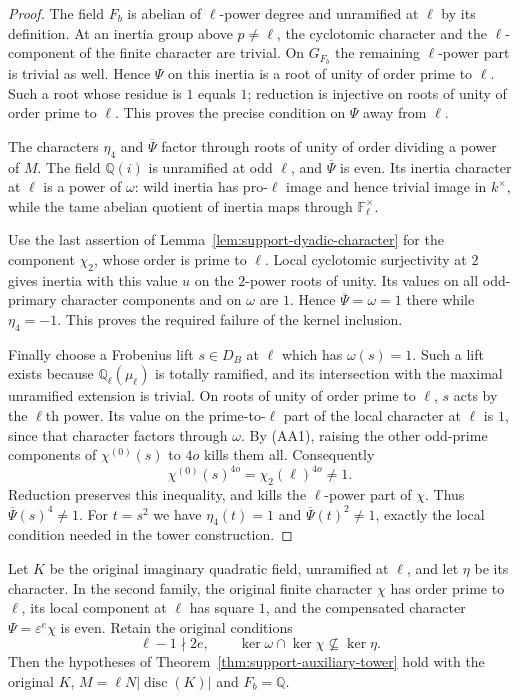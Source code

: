 \begin{proof}
The field $F_b$ is abelian of $\ell$-power degree and
unramified at $\ell$ by its definition.  At an inertia
group above $p\ne\ell$, the cyclotomic character and the
$\ell$-component of the finite character are trivial.
On $G_{F_b}$ the remaining $\ell$-power part is trivial
as well.  Hence $\Psi$ on this inertia is a root of unity
of order prime to $\ell$.  Such a root whose residue is
$1$ equals $1$; reduction is injective on roots of unity
of order prime to $\ell$.  This proves the precise
condition on $\Psi$ away from $\ell$.

The characters $\eta_4$ and $\overline\Psi$ factor through
roots of unity of order dividing a power of $M$.
The field $\mathbb Q(i)$ is unramified at odd $\ell$,
and $\overline\Psi$ is even.  Its inertia character at
$\ell$ is a power of $\omega$: wild inertia has pro-$\ell$
image and hence trivial image in $k^\times$, while the
tame abelian quotient of inertia maps through
$\mathbb F_\ell^\times$.

Use the last assertion of Lemma~\ref{lem:support-dyadic-character}
for the component $\chi_2$, whose order is prime to $\ell$.
Local cyclotomic surjectivity at $2$ gives inertia with
this value $u$ on the $2$-power roots of unity.  Its
values on all odd-primary character components and on
$\omega$ are $1$.  Hence $\overline\Psi=\omega=1$ there
while $\eta_4=-1$.  This proves the required failure of
the kernel inclusion.

Finally choose a Frobenius lift $s\in D_B$ at $\ell$
which has $\omega(s)=1$.  Such a lift exists because
$\mathbb Q_\ell(\mu_\ell)$ is totally ramified, and its
intersection with the maximal unramified extension is
trivial.  On roots of unity of order prime to $\ell$,
$s$ acts by the $\ell$th power.  Its value on the
prime-to-$\ell$ part of the local character at $\ell$
is $1$, since that character factors through $\omega$.
By (AA1), raising the other odd-prime components of
$\chi^{(0)}(s)$ to $4o$ kills them all.  Consequently
\[
     \chi^{(0)}(s)^{4o}=\chi_2(\ell)^{4o}\ne1.
\]
Reduction preserves this inequality, and kills the
$\ell$-power part of $\chi$.  Thus
$\overline\Psi(s)^4\ne1$.  For $t=s^2$ we have
$\eta_4(t)=1$ and $\overline\Psi(t)^2\ne1$, exactly the
local condition needed in the tower construction.
\end{proof}

\begin{proposition}
\label{prop:support-good-admission}
Let $K$ be the original imaginary quadratic field, unramified
at $\ell$, and let $\eta$ be its character.  In the second
family, the original finite character $\chi$ has order
prime to $\ell$, its local component at $\ell$ has square
$1$, and the compensated character $\Psi=\varepsilon^e\chi$
is even.  Retain the original conditions
\[
 \ell-1\nmid2e,
 \qquad \ker\omega\cap\ker\chi\nsubseteq\ker\eta.      \tag{AA2}
\]
Then the hypotheses of Theorem~\ref{thm:support-auxiliary-tower}
hold with the original $K$, $M=\ell N|\operatorname{disc}(K)|$
and $F_b=\mathbb Q$.
\end{proposition}


